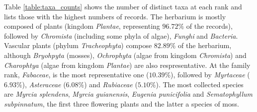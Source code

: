 Table \ref{table:taxa_counts} shows the number of distinct taxa at each rank and lists those with the highest numbers of records.
The herbarium is mostly composed of plants (kingdom \textit{Plantae}, representing $96.72\%$ of the records), followed by \textit{Chromista} (including some phyla of algae), \textit{Funghi} and \textit{Bacteria}.
Vascular plants (phylum \textit{Tracheophyta}) compose $82.89\%$ of the herbarium, although \textit{Bryohpyta} (mosses), \textit{Ochrophyta} (algae from kingdom \textit{Chromista}) and \textit{Charophtya} (algae from kingdom \textit{Plantae}) are also respresentative.
At the family rank, \textit{Fabaceae}, is the most representative one ($10.39\%$), followed by \textit{Myrtaceae} ($6.93\%$), \textit{Asteraceae} ($6.08\%$) and \textit{Rubiaceae} ($5.10\%$). 
The most collected species are \textit{Myrcia splendens}, \textit{Myrcia guianensis}, \textit{Eugenia punicifolia} and \textit{Sematophyllum subpinnatum}, the first three flowering plants and the latter a species of moss.

